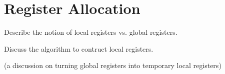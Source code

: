 \section{Register Allocation}
\label{sec:reg_alloc}

Describe the notion of local registers vs. global registers.

Discuss the algorithm to contruct local registers.

(a discussion on turning global registers into temporary local registers)
